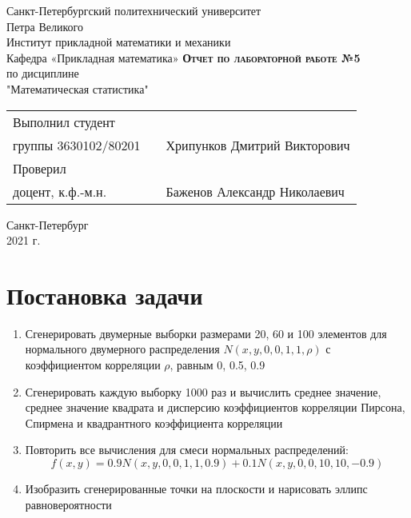 \documentclass[12pt,a4paper]{article}
\begin{document}
    \begin{titlepage}
        \begin{center}
            \large
            Санкт-Петербургский политехнический университет\\Петра Великого\\
            \vspace{0.5cm}
            Институт прикладной математики и механики\\
            \vspace{0.25cm}
            Кафедра «Прикладная математика»
            \vfill
            \textsc{\LARGE\textbf{Отчет по лабораторной работе №5}}\\[5mm]
            \Large
            по дисциплине\\"Математическая статистика"
        \end{center}
        \vfill
        \begin{tabular}{l p{175pt} l}
            Выполнил студент \\ группы 3630102/80201 && Хрипунков Дмитрий Викторович
            \vspace{0.25cm}
            \\Проверил \\ доцент, к.ф.-м.н. && Баженов Александр Николаевич
        \end{tabular}
        \vfill
        \begin{center}
            Санкт-Петербург \\ 2021 г.
        \end{center}
    \end{titlepage}
    
\newpage
\begin{center}
    \tableofcontents
    \setcounter{page}{2}
\end{center}
\newpage
\begin{center}
    \listoffigures
\end{center}

\newpage
\section{Постановка задачи}
\begin{enumerate}
    \item Сгенерировать двумерные выборки размерами 20, 60 и 100 элементов для нормального двумерного распределения $N(x, y, 0, 0, 1, 1, \rho)$ с коэффициентом корреляции $\rho$, равным 0, 0.5, 0.9
    \item Сгенерировать каждую выборку 1000 раз и вычислить среднее значение, среднее значение квадрата и дисперсию коэффициентов корреляции Пирсона, Спирмена и квадрантного коэффициента корреляции
    \item Повторить все вычисления для смеси нормальных распределений:
        \begin{equation}
	        f(x,y)=0.9N(x,y,0,0,1,1,0.9)+0.1N(x,y,0,0,10,10,-0.9)
        \end{equation}
    \item Изобразить сгенерированные точки на плоскости и нарисовать эллипс равновероятности
\end{enumerate}
\end{document}
